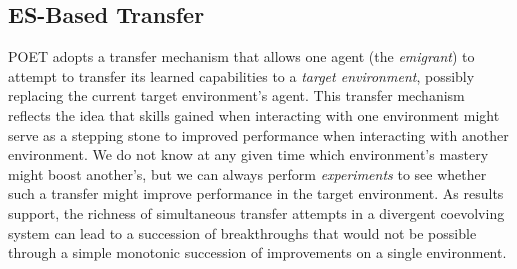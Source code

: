 \documentclass{article}
\newcommand{\jc}[1]{\comments{\textcolor{deepForestGreen}{[JC: #1]}}}
\newcommand{\ks}[1]{\comments{\textcolor{purple}{[Ken: #1]}}}
\newcommand{\rw}[1]{\comments{\textcolor{blue}{[Rui: #1]}}}
\newcommand{\comments}[1]{#1}
\begin{document}
\subsection{ES-Based Transfer} \label{Transfer Overview}
POET adopts a transfer mechanism that allows one agent (the \emph{emigrant})
to attempt to transfer its learned capabilities to 
a \emph{target environment}, possibly replacing the current target environment's agent. This transfer mechanism reflects the idea that skills gained when interacting with one environment might serve as a stepping stone to improved %
performance when interacting with another environment.  We do not know at any given time which environment's mastery might boost another's, but we can always perform \emph{experiments} to see whether such a transfer might improve performance in the target environment. As results support, the richness of simultaneous transfer attempts in a divergent coevolving system can lead to a succession of breakthroughs that would not be possible through a simple monotonic succession of improvements on a single environment.


\end{document}
